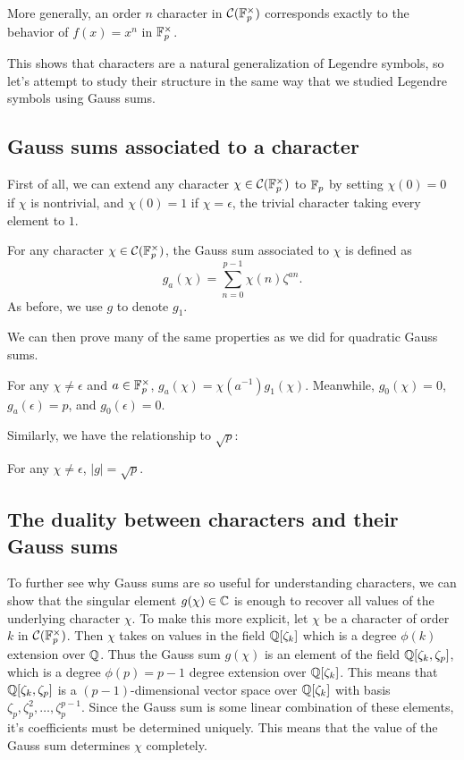 \documentclass[utf8, letterpaper]{article}
\begin{document}
\begin{proposition}
    More generally, an order $n$ character in $\mathcal{C}(\mathbb{F}_p^\times)$ corresponds exactly to the behavior of $f(x)=x^n$ in $\mathbb{F}_p^\times$.
\end{proposition}

This shows that characters are a natural generalization of Legendre symbols, so let's attempt to study their structure in the same way that we studied Legendre symbols using Gauss sums.

\subsection{Gauss sums associated to a character}
First of all, we can extend any character $\chi\in \mathcal{C}(\mathbb{F}_p^\times)$ to $\mathbb{F}_p$ by setting $\chi(0)=0$ if $\chi$ is nontrivial, and $\chi(0)=1$ if $\chi=\epsilon$, the trivial character taking every element to $1$.

\begin{definition}
    For any character $\chi\in \mathcal{C}(\mathbb{F}_p^\times)$, the Gauss sum associated to $\chi$ is defined as 
    \[
        g_a(\chi)=\sum^{p-1}_{n=0}\chi(n)\zeta^{an}
    .\] 
    As before, we use $g$ to denote $g_1$. 
\end{definition}

We can then prove many of the same properties as we did for quadratic Gauss sums.

\begin{proposition}
    For any $\chi\neq \epsilon$ and $a\in \mathbb{F}^\times_p$, $g_a(\chi)=\chi(a^{-1})g_1(\chi)$. Meanwhile, $g_0(\chi)=0$, $g_a(\epsilon)=p$, and $g_0(\epsilon)=0$.  
\end{proposition}

Similarly, we have the relationship to $\sqrt{p}$:

\begin{proposition}
    For any $\chi \neq \epsilon$, $|g|=\sqrt{p}$. 
\end{proposition}

\subsection{The duality between characters and their Gauss sums}

To further see why Gauss sums are so useful for understanding characters, we can show that the singular element $g(\chi)\in \mathbb{C}$ is enough to recover all values of the underlying character $\chi$. To make this more explicit, let $\chi$ be a character of order $k$ in $\mathcal{C}(\mathbb{F}_p^\times)$. Then $\chi$ takes on values in the field $\mathbb{Q}[\zeta_k]$ which is a degree $\phi(k)$ extension over $\mathbb{Q}$. Thus the Gauss sum $g(\chi)$ is an element of the field $\mathbb{Q}[\zeta_k, \zeta_p]$, which is a degree $\phi(p)=p-1$ degree extension over $\mathbb{Q}[\zeta_k]$. This means that $\mathbb{Q}[\zeta_k, \zeta_p]$ is a $(p-1)$-dimensional vector space over $\mathbb{Q}[\zeta_k]$ with basis $\zeta_p, \zeta_p^2,\ldots,\zeta_p^{p-1}$. Since the Gauss sum is some linear combination of these elements, it's coefficients must be determined uniquely. This means that the value of the Gauss sum determines $\chi$ completely.
\end{document}
